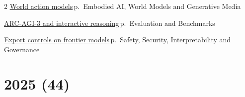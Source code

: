 \documentclass[10pt,a4paper,openany]{report}
\begin{document}
\begin{multicols}{2}
\hyperref[c:embodied-1]{World action models}\,{\color{muted}\scriptsize p.\,\pageref{c:embodied-1}} {\color{muted}\scriptsize Embodied AI, World Models and Generative Media}\par\vspace{2pt}
\hyperref[c:evals-4]{ARC-AGI-3 and interactive reasoning}\,{\color{muted}\scriptsize p.\,\pageref{c:evals-4}} {\color{muted}\scriptsize Evaluation and Benchmarks}\par\vspace{2pt}
\hyperref[c:safety-2]{Export controls on frontier models}\,{\color{muted}\scriptsize p.\,\pageref{c:safety-2}} {\color{muted}\scriptsize Safety, Security, Interpretability and Governance}\par\vspace{2pt}
\end{multicols}
\section{2025 (44)}
\end{document}
